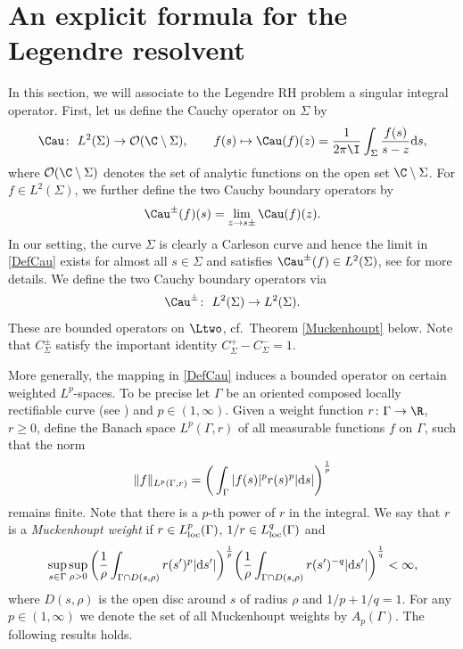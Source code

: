 \section{An explicit formula for the Legendre resolvent}\label{Section_LegendreResolvent}
In this section, we will associate to the Legendre RH problem a singular integral operator. First, let us define the Cauchy operator on $\Sigma$ by
\begin{align*}
 \Cau \colon\ L^2(\Sigma) \to \mathcal O(\C \setminus \Sigma), \qquad f(s) \mapsto \Cau(f)(z) = \frac{1}{2\pi \I }\int_\Sigma \frac{f(s)}{s-z} {\rm d}s,
\end{align*}
where $\mathcal O(\C \setminus \Sigma)$ denotes the set of analytic functions on the open set $\C \setminus \Sigma$. For $f \in L^2(\Sigma)$, we further define the two Cauchy boundary operators by
\begin{align}\label{DefCau}
 \Cau^\pm(f)(s) = \lim_{z\to s\pm} \Cau(f)(z).
\end{align}
In our setting, the curve $\Sigma$ is clearly a Carleson curve and hence the limit in \eqref{DefCau} exists for almost all $s \in \Sigma$
and satisfies $\Cau^\pm(f) \in L^2(\Sigma)$, see \cite{BK} for more details. We define the two Cauchy boundary operators via
\begin{align*}
\Cau^\pm \colon\ L^2(\Sigma) \to L^2(\Sigma).
\end{align*}
These are bounded operators on $\Ltwo$, cf.\ Theorem \ref{Muckenhoupt} below. Note that $C^\pm_{\Sigma}$ satisfy the important identity $C^+_\Sigma - C^-_\Sigma = 1$.

More generally, the mapping in \eqref{DefCau} induces a bounded operator on certain weighted $L^p$-spaces. To be precise let $\Gamma$ be an oriented composed locally rectifiable curve (see \cite[Section~1]{BK}) and $p \in (1,\infty)$. Given a weight function $r \colon \Gamma \to \R$, $r \geq 0$, define the Banach space $L^p(\Gamma, r)$ of all measurable functions $f$ on $\Gamma$, such that the norm
\begin{align*}
 \Vert f \Vert_{L^p(\Gamma, r)} = \bigg( \int_\Gamma |f(s)|^p r(s)^p |{\rm d}s| \bigg)^{\frac{1}{p}}
\end{align*}
remains finite. Note that there is a $p$-th power of $r$ in the integral. We say that $r$ is a \emph{Muckenhoupt weight} if $r \in L^p_{\rm loc}(\Gamma)$, $1/r \in L^q_{\rm loc}(\Gamma)$ and
\begin{align*}
 \sup_{s\in \Gamma} \sup_{\rho > 0} \bigg(\frac{1}{\rho} \int_{\Gamma \cap D(s, \rho)} r(s')^p |{\rm d}s'| \bigg)^{\frac{1}{p}}
 \bigg( \frac{1}{\rho}\int_{\Gamma \cap D(s, \rho)} r(s')^{-q}|{\rm d}s'| \bigg)^{\frac{1}{q}} < \infty,
\end{align*}
where $D(s, \rho)$ is the open disc around $s$ of radius $\rho$ and $1/p + 1/q = 1$. For any $p \in (1, \infty)$ we denote the set of all Muckenhoupt weights by $A_p(\Gamma)$. The following results holds.

